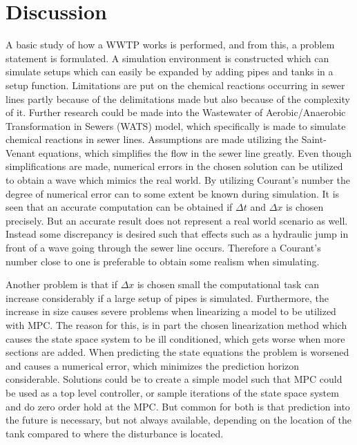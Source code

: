 \chapter{Discussion}\label{ch:discussion}
A basic study of how a WWTP works is performed, and from this, a problem statement is formulated. A simulation environment is constructed which can simulate setups which can easily be expanded by adding pipes and tanks in a setup function. Limitations are put on the chemical reactions occurring in sewer lines partly because of the delimitations made but also because of the complexity of it. Further research could be made into the Wastewater of Aerobic/Anaerobic Transformation in Sewers (WATS) model, which specifically is made to simulate chemical reactions in sewer lines. Assumptions are made utilizing the Saint-Venant equations, which simplifies the flow in the sewer line greatly. Even though simplifications are made, numerical errors in the chosen solution can be utilized to obtain a wave which mimics the real world. By utilizing Courant's number the degree of numerical error can to some extent be known during simulation. It is seen that an accurate computation can be obtained if $\Delta t$ and $\Delta x$ is chosen precisely. But an accurate result does not represent a real world scenario as well. Instead some discrepancy is desired such that effects such as a hydraulic jump in front of a wave going through the sewer line occurs.
Therefore a Courant's number close to one is preferable to obtain some realism when simulating. 

Another problem is that if $\Delta x$ is chosen small the computational task can increase considerably if a large setup of pipes is simulated. Furthermore, the increase in size causes severe problems when linearizing a model to be utilized with MPC. The reason for this, is in part the chosen linearization method which causes the state space system to be ill conditioned, which gets worse when more sections are added. When predicting the state equations the problem is worsened and causes a numerical error, which minimizes the prediction horizon considerable. Solutions could be to create a simple model such that MPC could be used as a top level controller, or sample iterations of the state space system and do zero order hold at the MPC. But common for both is that prediction into the future is necessary, but not always available, depending on the location of the tank compared to where the disturbance is located.






